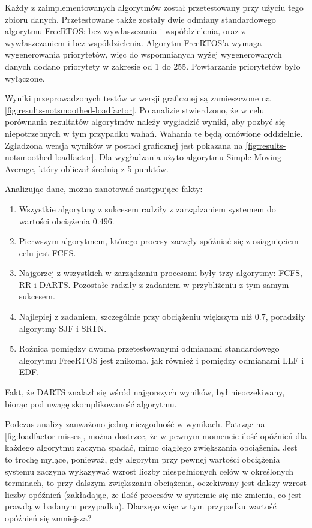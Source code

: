\documentclass[../../main]{subfiles}
\begin{document}
Każdy z zaimplementowanych algorytmów został przetestowany przy użyciu tego zbioru danych. Przetestowane także zostały dwie odmiany standardowego algorytmu FreeRTOS: bez wywłaszczania i współdzielenia, oraz z wywłaszczaniem i bez współdzielenia. Algorytm FreeRTOS'a wymaga wygenerowania priorytetów, więc do wspomnianych wyżej wygenerowanych danych dodano priorytety w zakresie od 1 do 255. Powtarzanie priorytetów było wyłączone.

Wyniki przeprowadzonych testów w wersji graficznej są zamieszczone na \cref{fig:results-notsmoothed-loadfactor}. Po analizie stwierdzono, że w celu porównania rezultatów algorytmów należy wygładzić wyniki, aby pozbyć się niepotrzebnych w tym przypadku wahań. Wahania te będą omówione oddzielnie. Zgładzona wersja wyników w postaci graficznej jest pokazana na \cref{fig:results-notsmoothed-loadfactor}. Dla wygładzania użyto algorytmu Simple Moving Average, który obliczał średnią z 5 punktów.

Analizując dane, można zanotować następujące fakty:

\begin{enumerate}
    \item Wszystkie algorytmy z sukcesem radziły z zarządzaniem systemem do wartości obciążenia $0.496$.
    \item Pierwszym algorytmem, którego procesy zaczęły spóźniać się z osiągnięciem celu jest FCFS.
    \item Najgorzej z wszystkich w zarządzaniu procesami były trzy algorytmy: FCFS, RR i DARTS. Pozostałe radziły z zadaniem w przybliżeniu z tym samym sukcesem.
    \item Najlepiej z zadaniem, szczególnie przy obciążeniu większym niż $0.7$, poradziły algorytmy SJF i SRTN.
    \item Rożnica pomiędzy dwoma przetestowanymi odmianami standardowego algorytmu FreeRTOS jest znikoma, jak również i pomiędzy odmianami LLF i EDF.
\end{enumerate}

\FloatBarrier

Fakt, że DARTS znalazł się wśród najgorszych wyników, był nieoczekiwany, biorąc pod uwagę skomplikowaność algorytmu.

Podczas analizy zauważono jedną niezgodność w wynikach. Patrząc na \cref{fig:loadfactor-misses}, można dostrzec, że w pewnym momencie ilość opóźnień dla każdego algorytmu zaczyna spadać, mimo ciągłego zwiększania obciążenia. Jest to trochę mylące, ponieważ, gdy algorytm przy pewnej wartości obciążenia systemu zaczyna wykazywać wzrost liczby niespełnionych celów w określonych terminach, to przy dalszym zwiększaniu obciążenia, oczekiwany jest dalszy wzrost liczby opóźnień (zakładając, że ilość procesów w systemie się nie zmienia, co jest prawdą w badanym przypadku). Dlaczego więc w tym przypadku wartość opóźnień się zmniejsza?
\end{document}
